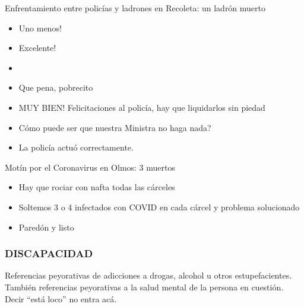 \begin{displayquote}
     Enfrentamiento entre policías y ladrones en Recoleta: un ladrón muerto

    \begin{itemize}
        \item Uno menos!
        \item Excelente!
        \item {}
        \item Que pena, pobrecito
    \end{itemize}

    \begin{itemize}
        \item MUY BIEN! Felicitaciones al policía, hay que liquidarlos sin piedad
    \end{itemize}


    \begin{itemize}
        \item Cómo puede ser que nuestra Ministra no haga nada?
        \item La policía actuó correctamente.
    \end{itemize}

     Motín por el Coronavirus en Olmos: 3 muertos


    \begin{itemize}
        \item Hay que rociar con nafta todas las cárceles
        \item Soltemos 3 o 4 infectados con COVID en cada cárcel y problema solucionado
        \item Paredón y listo
    \end{itemize}

\end{displayquote}







\subsubsection{DISCAPACIDAD}


Referencias peyorativas de adicciones a drogas, alcohol u otros estupefacientes. También referencias peyorativas a la salud mental de la persona en cuestión. Decir ``está loco'' no entra acá.


